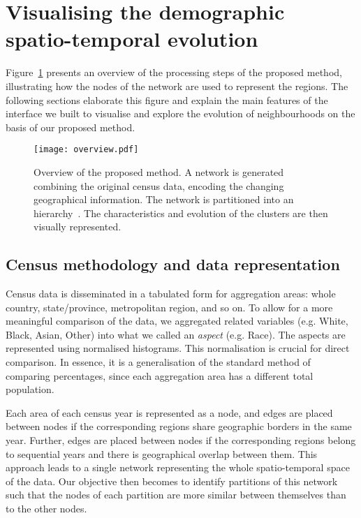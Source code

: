 \section{Visualising the demographic spatio-temporal evolution}
\label{sec:method}
Figure~\ref{fig:overview} presents an overview of the processing steps of the
proposed method, illustrating how the nodes of the network are used to represent
the regions. The following sections elaborate this figure and explain the main
features of the interface we built to visualise and explore the evolution of
neighbourhoods on the basis of our proposed method.


\begin{figure}
    \centering 
    \texttt{[image: overview.pdf]}
    \caption{Overview of the proposed method. A network is generated combining the
        original census data, encoding the changing geographical information.
        The network is partitioned into an hierarchy~\citep{markus2017}. The
        characteristics and evolution of the clusters are then visually
        represented.
        \label{fig:overview}}
\end{figure}


\subsection{Census methodology and data representation}

Census data is disseminated in a tabulated form for aggregation areas: whole
country, state/province, metropolitan region, and so on. To allow for a more
meaningful comparison of the data, we aggregated related variables (e.g. White,
Black, Asian, Other) into what we called an \emph{aspect} (e.g. Race). The
aspects are represented using normalised histograms. This normalisation is
crucial for direct comparison. In essence, it is a generalisation of the
standard method of comparing percentages, since each aggregation area has a
different total population.

Each area of each census year is represented as a node, and edges are placed
between nodes if the corresponding regions share geographic borders in the same
year. Further, edges are placed between nodes if the corresponding regions
belong to sequential years and there is geographical overlap between them. This
approach leads to a single network representing the whole spatio-temporal space
of the data. Our objective then becomes to identify partitions of this network
such that the nodes of each partition are more similar between themselves than
to the other nodes. 


